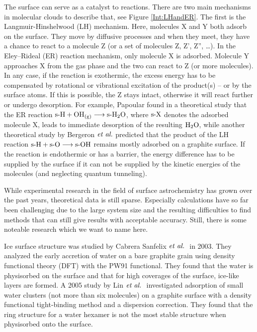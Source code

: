 The surface can serve as a catalyst to reactions. There are two main mechanisms
in molecular clouds to describe that, see Figure \ref{Int:LHandER}. The first
is the Langmuir-Hinshelwood (LH) mechanism.\cite{LangmuirHinshelwood} Here, molecules X and Y both adsorb on the surface. They move by diffusive processes and when they meet, they have a
chance to react to a molecule Z (or a set of molecules Z, Z', Z'', \ldots).
In the Eley--Rideal (ER) reaction mechanism, only molecule X
is adsorbed.\cite{Laidler1996}
Molecule Y approaches X from the gas phase and the two can react to Z (or more
molecules). In any case, if the reaction is exothermic, the excess energy has
to be compensated by rotational or vibrational excitation of the product(s) --
or by the surface atoms.
If this is possible, the Z stays intact, otherwise it will react further or
undergo desorption. For example, Papoular found in a
theoretical study that the ER reaction $\text{s-}{\text H}+{\text O \text H}_\text{(g)}\longrightarrow\text{s-}{\ensuremath{\text H _2 \text O}}$,
where $\text{s-}{\text X}$ denotes the adsorbed molecule X, leads to immediate
desorption of the resulting $\text H _2 \text O$,\cite{Papoular2005} while another theoretical study by
Bergeron $\emph{et al.}$ predicted that the product of the LH reaction $\text{s-}{\text H}+\text{s-}{\text O}\longrightarrow\text{s-}{\ensuremath{\text O \text H}}$ remains mostly adsorbed on a graphite
surface.\cite{BergeronRougeauSidisEtAl2008} If the reaction is endothermic or
has a barrier, the energy difference has to be supplied by the surface if it
can not be supplied by the kinetic energies of the molecules (and neglecting
quantum tunneling).

While experimental research in the field of surface astrochemistry has grown
over the past years, theoretical data is still sparse. Especially 
calculations have so far been challenging due to the large system size and the
resulting difficulties to find methods that can still give results with
acceptable accuracy. Still, there is some noteable research which we want to
name here.

Ice surface structure was studied by Cabrera Sanfelix $\emph{et al.}~$ 
in 2003.\cite{CabreraSanfelix2003} They analyzed the early accretion of water
on a bare graphite grain using density functional theory (DFT) with the PW91
functional.\cite{PerdewWang1986,PerdewWang1992} They found that the water is
physisorbed on the surface and that for high coverages of the surface, ice-like
layers are formed. A 2005 study by Lin $\emph{et al.}~$
investigated adsorption of small water clusters (not more than six molecules)
on a graphite surface with a density functional tight-binding method and a
dispersion correction. They found that the ring structure for a water hexamer
is not the most stable structure when physisorbed onto the
surface.\cite{LinZhangLeeEtAl2005}

